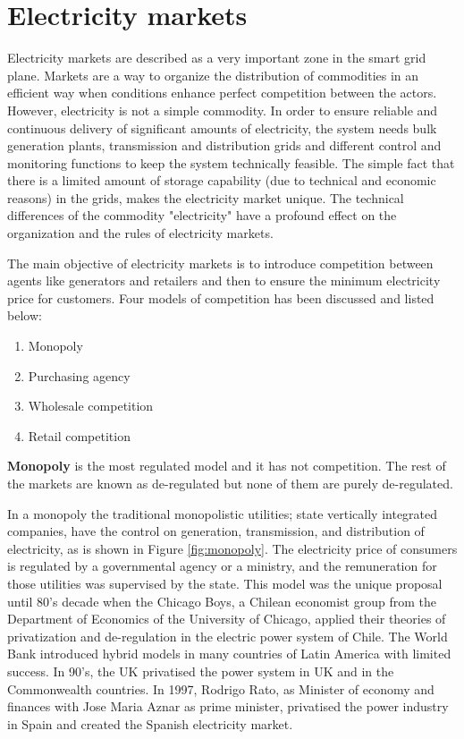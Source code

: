 \documentclass[a4paper,11pt,twoside,openright]{report}
\begin{document}
\section{Electricity markets}
\label{sec:markets}
Electricity markets are described as a very important zone in the smart grid plane. Markets are a way to organize the distribution of commodities in an efficient way when conditions enhance perfect competition between the actors. However, electricity is not a simple commodity. In order to ensure  reliable and continuous delivery of significant amounts of electricity, the system needs bulk generation plants, transmission and distribution grids and different control and monitoring functions to keep the system technically feasible. The simple fact that there is a limited amount of storage capability (due to technical and economic reasons) in the grids, makes the electricity market unique. The technical differences of the commodity "electricity" have a profound effect on the organization and the rules of electricity markets.

The main objective of electricity markets is to introduce competition between agents like generators and retailers and then to ensure the minimum electricity price for customers. Four models of competition has been discussed \cite{Economics_Kirschen} and listed below:

\begin{enumerate}
	\item Monopoly
	\item Purchasing agency
	\item Wholesale competition
	\item Retail competition
\end{enumerate}

\textbf{Monopoly} is the most regulated model and it has not competition. The rest of the markets are known as de-regulated but none of them are purely de-regulated. 

In a monopoly the traditional monopolistic utilities; state vertically integrated companies, have the control on generation, transmission, and distribution of electricity, as is shown in Figure \ref{fig:monopoly}. The electricity price of consumers is regulated by a governmental agency or a ministry, and the remuneration for those utilities was supervised by the state. This model was the unique proposal until 80's decade when the Chicago Boys, a Chilean economist group from the Department of Economics of the University of Chicago, applied their theories of privatization and de-regulation in the electric power system of Chile. The World Bank introduced hybrid models in many countries of Latin America with limited success. In 90's, the UK privatised the power system in UK and in the Commonwealth countries. In 1997, Rodrigo Rato, as Minister of economy and finances with Jose Maria Aznar as prime minister, privatised the power industry in Spain and created the Spanish electricity market.
\end{document}
